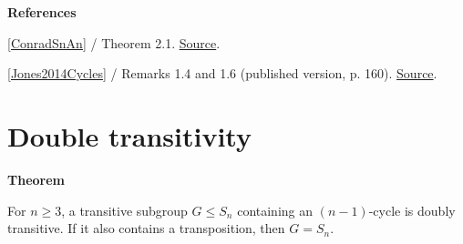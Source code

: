 \documentclass[11pt,a4paper,oneside,openany]{book}
\newenvironment{sources}{\par\smallskip\begingroup\footnotesize\color{atlasgray}\leftskip=10pt\setlength{\parskip}{2pt}}{\par\endgroup\smallskip}
\begin{document}
\begin{sources}
\textbf{References}\par\smallskip
\noindent\hyperlink{ref:ConradSnAn}{[ConradSnAn]} / Theorem 2.1.  \href{https://kconrad.math.uconn.edu/blurbs/galoistheory/galoisSnAn.pdf}{Source}.\par
\noindent\hyperlink{ref:Jones2014Cycles}{[Jones2014Cycles]} / Remarks 1.4 and 1.6 (published version, p. 160).  \href{https://doi.org/10.1017/S000497271300049X}{Source}.\par
\end{sources}\color{black}
\section{Double transitivity}

\begin{atlasblock}[standard]
\textbf{\sffamily Theorem}\par\smallskip
\color{black} For \(n\ge3\), a transitive subgroup \(G\le S_n\) containing an \((n-1)\)-cycle is doubly transitive. If it also contains a transposition, then \(G=S_n\).\par
\end{atlasblock}\color{black}
\end{document}
